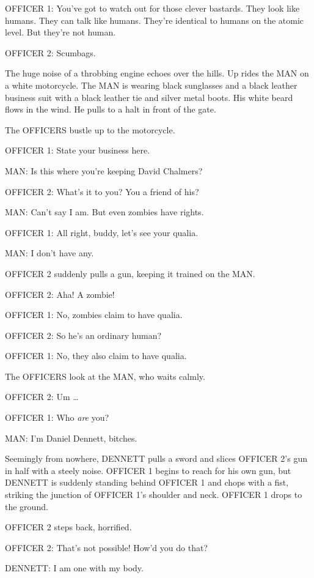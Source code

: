 {
 OFFICER 1: You've got to watch out for those
clever bastards. They look like humans. They can talk like humans.
They're identical to humans on the atomic level. But
they're not human.}

{
 OFFICER 2: Scumbags.}

{
 The huge noise of a throbbing engine echoes over the hills. Up
rides the MAN on a white motorcycle. The MAN is wearing black
sunglasses and a black leather business suit with a black leather tie
and silver metal boots. His white beard flows in the wind. He pulls to
a halt in front of the gate.}

{
 The OFFICERS bustle up to the motorcycle.}

{
 OFFICER 1: State your business here.}

{
 MAN: Is this where you're keeping David Chalmers?}

{
 OFFICER 2: What's it to you? You a friend of his?}

{
 MAN: Can't say I am. But even zombies have
rights.}

{
 OFFICER 1: All right, buddy, let's see your
qualia.}

{
 MAN: I don't have any.}

{
 OFFICER 2 suddenly pulls a gun, keeping it trained on the MAN.}

{
 OFFICER 2: Aha! A zombie!}

{
 OFFICER 1: No, zombies claim to have qualia.}

{
 OFFICER 2: So he's an ordinary human?}

{
 OFFICER 1: No, they also claim to have qualia.}

{
 The OFFICERS look at the MAN, who waits calmly.}

{
 OFFICER 2: Um \ldots}

{
 OFFICER 1: Who \textit{are} you?}

{
 MAN: I'm Daniel Dennett, bitches.}

{
 Seemingly from nowhere, DENNETT pulls a sword and slices OFFICER
2's gun in half with a steely noise. OFFICER 1 begins
to reach for his own gun, but DENNETT is suddenly standing behind
OFFICER 1 and chops with a fist, striking the junction of OFFICER
1's shoulder and neck. OFFICER 1 drops to the ground.}

{
 OFFICER 2 steps back, horrified.}

{
 OFFICER 2: That's not possible!
How'd you do that?}

{
 DENNETT: I am one with my body.}

